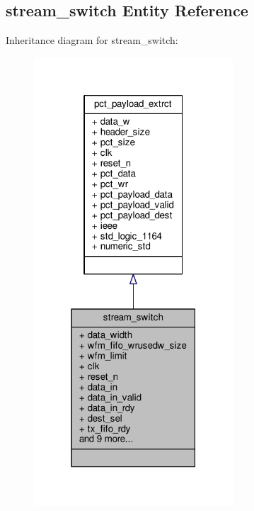 \subsection{stream\+\_\+switch Entity Reference}
\label{classstream__switch}


Inheritance diagram for stream\+\_\+switch\+:\nopagebreak
\begin{figure}[H]
\begin{center}
\leavevmode
\includegraphics[width=211pt]{d0/ded/classstream__switch__inherit__graph}
\end{center}
\end{figure}


